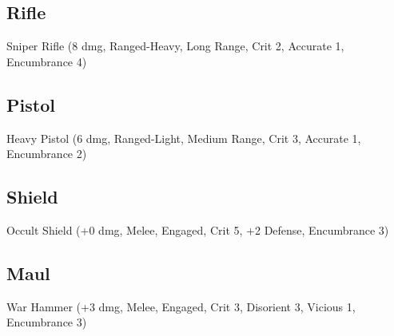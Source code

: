 \documentclass{book}
\begin{document}
\begin{multicols}{2}
\subsection{Rifle}

Sniper Rifle (8 dmg, Ranged-Heavy, Long Range, Crit 2, Accurate 1, Encumbrance 4)

\subsection{Pistol}

Heavy Pistol (6 dmg, Ranged-Light, Medium Range, Crit 3, Accurate 1, Encumbrance 2)

\subsection{Shield}

Occult Shield (+0 dmg, Melee, Engaged, Crit 5, +2 Defense, Encumbrance 3)

\subsection{Maul}

War Hammer (+3 dmg, Melee, Engaged, Crit 3, Disorient 3, Vicious 1, Encumbrance 3)



\end{multicols}
\end{document}
